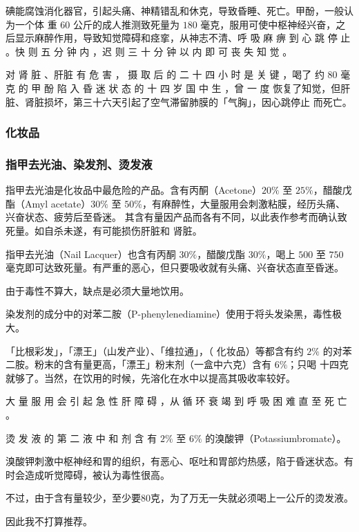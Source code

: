 \documentclass[UTF8]{ctexart}
\begin{document}
碘能腐蚀消化器官，引起头痛、神精错乱和休克，导致昏睡、死亡。甲酚，一般认为一个体
重 $60$ 公斤的成人推测致死量为 $180$ 毫克，服用可使中枢神经兴奋，之后显示麻醉作用，导致知觉障碍和痉挛，从神志不清、呼
吸 麻 痹 到 心 跳 停 止 。快 则 五 分 钟 内 ，迟 则 三 十 分 钟 以 内 即 可 丧 失 知 觉 。

对 肾 脏 、肝脏 有 危 害 ， 摄 取 后 的 二 十 四 小 时 是 关 键 ，喝了 约 $80$ 毫 克 的 甲 酚 陷 入 昏 迷 状 态 的 十 四 岁 国 中 生 ，曾 一 度 恢复了知觉，但肝脏、肾脏损坏，第三十六天引起了空气滞留肺膜的「气胸」，因心跳停止 而死亡。

\subsubsection{化妆品}

\subsubsection*{指甲去光油、染发剂、烫发液}

指甲去光油是化妆品中最危险的产品。含有丙酮（Acetone）$20\%$ 至 $25\%$，醋酸戊酯（Amyl
acetate）$30\%$ 至 $50\%$，有麻醉性，大量服用会刺激粘膜，经历头痛、兴奋状态、疲劳后至昏迷。
其含有量因产品而各有不同，以此表作参考而确认致死量。如自杀未遂，有可能损伤肝脏和
肾脏。

指甲去光油（Nail Lacquer）也含有丙酮 $30\%$，醋酸戊酯 $30\%$，喝上 $500$ 至 $750$
毫克即可达致死量。有严重的恶心，但只要吸收就有头痛、兴奋状态直至昏迷。

由于毒性不算大，缺点是必须大量地饮用。

染发剂的成分中的对苯二胺（P-phenylenediamine）使用于将头发染黑，毒性极大。

「比根彩发」，「漂王」（山发产业）、「维拉通」，（ 化妆品）等都含有约
$2\%$ 的对苯二胺。粉末的含有量更高，「漂王」粉末剂（一盒中六克）含有 $6\%$；只喝
十四克就够了。当然，在饮用的时候，先溶化在水中以提高其吸收率较好。

大 量 服 用 会 引 起 急 性 肝 障 碍 ，从 循 环 衰 竭 到 呼 吸 困 难 直 至 死 亡 。

烫 发 液 的 第 二 液 中 和 剂 含 有 $2\%$ 至 $6\%$ 的溴酸钾（Potassiumbromate）。

溴酸钾刺激中枢神经和胃的组织，有恶心、呕吐和胃部灼热感，陷于昏迷状态。有时会造成听觉障碍，被认为毒性很高。

不过，由于含有量较少，至少要$80$克，为了万无一失就必须喝上一公斤的烫发液。

因此我不打算推荐。
\end{document}
